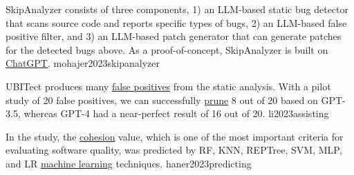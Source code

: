 \documentclass{article}
\begin{document}
  {SkipAnalyzer consists of three components, 1) an LLM-based static bug detector that scans source code and reports specific types of bugs, 2) an LLM-based false positive filter, and 3) an LLM-based patch generator that can generate patches for the detected bugs above. As a proof-of-concept, SkipAnalyzer is built on \ul{ChatGPT}.}
  {mohajer2023skipanalyzer}

  {UBITect produces many \ul{false positives} from the static analysis. With a pilot study of 20 false positives, we can successfully \ul{prune} 8 out of 20 based on GPT-3.5, whereas GPT-4 had a near-perfect result of 16 out of 20.}
  {li2023assisting}

  {In the study, the \ul{cohesion} value, which is one of the most important criteria for evaluating software quality, was predicted by RF, KNN, REPTree, SVM, MLP, and LR \ul{machine learning} techniques.}
  {haner2023predicting}

\end{document}
